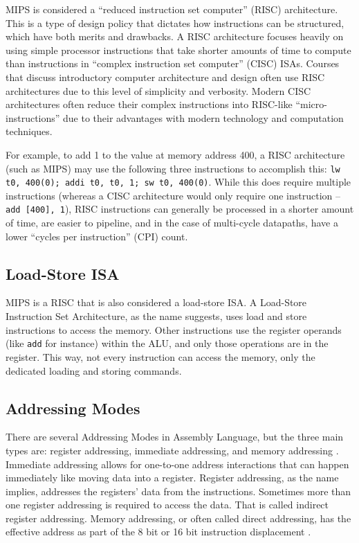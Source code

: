 \documentclass[
    paper=letter,
    parskip=half,
    fontsize=12pt,
    titlepage=firstiscover,
    toc=bibliography,
    numbers=endperiod
]{scrartcl}
\begin{document}
MIPS is considered a ``reduced instruction set computer'' (RISC)
architecture. This is a type of design policy that dictates how
instructions can be structured, which have both merits and drawbacks. A
RISC architecture focuses heavily on using simple processor instructions
that take shorter amounts of time to compute than instructions in
``complex instruction set computer'' (CISC) ISAs. Courses that discuss
introductory computer architecture and design often use RISC
architectures due to this level of simplicity and verbosity. Modern CISC
architectures often reduce their complex instructions into RISC-like
``micro-instructions'' due to their advantages with modern technology
and computation techniques.

For example, to add 1 to the value at memory address 400, a RISC
architecture (such as MIPS) may use the following three instructions to
accomplish this: \texttt{lw t0, 400(0); addi t0, t0, 1; sw t0, 400(0)}.
While this does require multiple instructions (whereas a CISC
architecture would only require one instruction -- \texttt{add [400],
    1}), RISC instructions can generally be processed in a shorter amount of
time, are easier to pipeline, and in the case of multi-cycle datapaths,
have a lower ``cycles per instruction'' (CPI) count.

\subsection{Load-Store ISA}

MIPS is a RISC that is also considered a load-store ISA. A Load-Store
Instruction Set Architecture, as the name suggests, uses load and store
instructions to access the memory. Other instructions use the register
operands (like \texttt{add} for instance) within the ALU, and only those
operations are in the register. This way, not every instruction can
access the memory, only the dedicated loading and storing commands.

\subsection{Addressing Modes}

There are several Addressing Modes in Assembly Language, but the three
main types are: register addressing, immediate addressing, and memory
addressing \cite{tutorialspoint-assembly-addressing-modes}. Immediate
addressing allows for one-to-one address interactions that can happen
immediately like moving data into a register. Register addressing, as
the name implies, addresses the registers' data from the instructions.
Sometimes more than one register addressing is required to access the
data. That is called indirect register addressing. Memory addressing, or
often called direct addressing, has the effective address as part of the
8 bit or 16 bit instruction displacement \cite{gfg-addressing-modes}.
\end{document}
